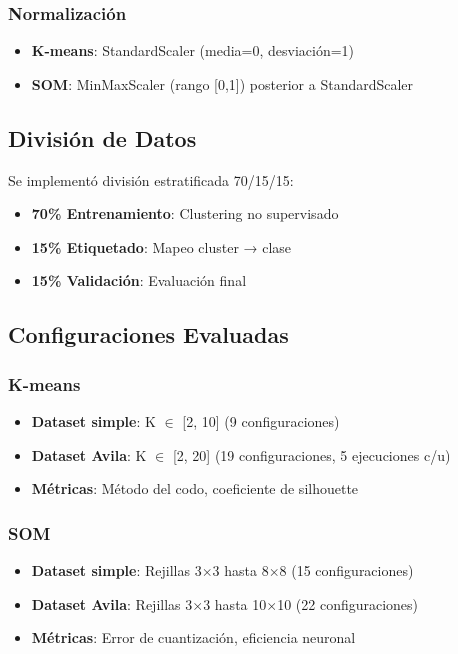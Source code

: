 \documentclass[12pt,a4paper]{article}
\begin{document}
\subsubsection{Normalización}
\begin{itemize}
    \item \textbf{K-means}: StandardScaler (media=0, desviación=1)
    \item \textbf{SOM}: MinMaxScaler (rango [0,1]) posterior a StandardScaler
\end{itemize}

\subsection{División de Datos}
Se implementó división estratificada 70/15/15:
\begin{itemize}
    \item \textbf{70\% Entrenamiento}: Clustering no supervisado
    \item \textbf{15\% Etiquetado}: Mapeo cluster → clase
    \item \textbf{15\% Validación}: Evaluación final
\end{itemize}

\subsection{Configuraciones Evaluadas}

\subsubsection{K-means}
\begin{itemize}
    \item \textbf{Dataset simple}: K $\in$ [2, 10] (9 configuraciones)
    \item \textbf{Dataset Avila}: K $\in$ [2, 20] (19 configuraciones, 5 ejecuciones c/u)
    \item \textbf{Métricas}: Método del codo, coeficiente de silhouette
\end{itemize}

\subsubsection{SOM}
\begin{itemize}
    \item \textbf{Dataset simple}: Rejillas 3$\times$3 hasta 8$\times$8 (15 configuraciones)
    \item \textbf{Dataset Avila}: Rejillas 3$\times$3 hasta 10$\times$10 (22 configuraciones)
    \item \textbf{Métricas}: Error de cuantización, eficiencia neuronal
\end{itemize}
\end{document}
